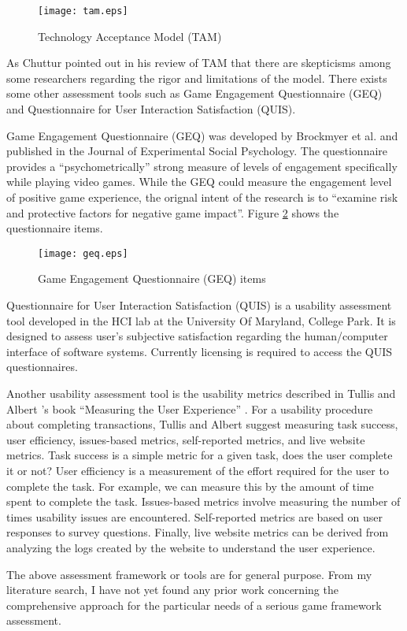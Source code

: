 \begin{figure}[htbp]
	\centering
		\texttt{[image: tam.eps]}
		\caption{Technology Acceptance Model (TAM) \cite{davis1986technology}}
		\label{fig:tam}
\end{figure}

As Chuttur \cite{chuttur2009overview} pointed out in his review of TAM that there are skepticisms among some researchers regarding the rigor and limitations of the model. There exists some other assessment tools such as Game Engagement Questionnaire (GEQ) and Questionnaire for User Interaction Satisfaction (QUIS).  

Game Engagement Questionnaire (GEQ) \cite{brockmyer2009development} was developed by Brockmyer et al. and published in the Journal of Experimental Social Psychology. The questionnaire provides a ``psychometrically'' strong measure of levels of engagement specifically while playing video games. While the GEQ could measure the engagement level of positive game experience, the orignal intent of the research is to ``examine risk and protective factors for negative game impact''. Figure \ref{fig:geq} shows the questionnaire items.

\begin{figure}[htbp]
	\centering
		\texttt{[image: geq.eps]}
		\caption{Game Engagement Questionnaire (GEQ) items \cite{brockmyer2009development}}
		\label{fig:geq}
\end{figure}

Questionnaire for User Interaction Satisfaction (QUIS) \cite{harper1993improving} is a usability assessment tool developed in the HCI lab at the University Of Maryland, College Park. It is designed to assess user's subjective satisfaction regarding the human/computer interface of software systems. Currently licensing is required to access the QUIS questionnaires. 

Another usability assessment tool is the usability metrics described in Tullis and Albert 's book ``Measuring the User Experience'' \cite{tullis2010measuring}. For a usability procedure about completing transactions, Tullis and Albert suggest measuring task success, user efficiency, issues-based metrics, self-reported metrics, and live website metrics. Task success is a simple metric for a given task, does the user complete it or not? User efficiency is a measurement
of the effort required for the user to complete the task. For example, we can measure this by the amount of time spent to complete the task. Issues-based metrics involve measuring the number of times usability issues are encountered. Self-reported metrics are based on user responses to survey questions. Finally, live website metrics can be derived from analyzing the logs created by the website to understand the user experience.

The above assessment framework or tools are for general purpose. From my literature search, I have not yet found any prior work concerning the comprehensive approach for the particular needs of a serious game framework assessment. 